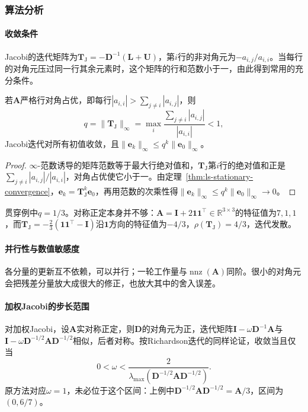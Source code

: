 \subsubsection{算法分析}

\paragraph{收敛条件}
Jacobi的迭代矩阵为$\bm T_{\mathrm J}=-\bm D^{-1}(\bm L+\bm U)$，第$i$行的非对角元为$-a_{i,j}/a_{i,i}$。当每行的对角元压过同一行其余元素时，这个矩阵的行和范数小于一，由此得到常用的充分条件。
\begin{theorem}[Jacobi迭代的收敛条件]
\label{thm:ls-jacobi-convergence}
若$\bm A$严格行对角占优，即每行$|a_{i,i}|>\sum_{j\neq i}|a_{i,j}|$，则
\[
q=\lVert\bm T_{\mathrm J}\rVert_\infty=\max_i\frac{\sum_{j\neq i}|a_{i,j}|}{|a_{i,i}|}<1,
\]
Jacobi迭代对所有初值收敛，且$\lVert\bm e_k\rVert_\infty\leq q^k\lVert\bm e_0\rVert_\infty$。
\end{theorem}
\begin{proof}
$\infty$-范数诱导的矩阵范数等于最大行绝对值和，$\bm T_{\mathrm J}$第$i$行的绝对值和正是$\sum_{j\neq i}|a_{i,j}|/|a_{i,i}|$，对角占优使它小于一。由定理~\ref{thm:ls-stationary-convergence}，$\bm e_k=\bm T_{\mathrm J}^k\bm e_0$，再用范数的次乘性得$\lVert\bm e_k\rVert_\infty\leq q^k\lVert\bm e_0\rVert_\infty\to0$。
\end{proof}
贯穿例中$q=1/3$。对称正定本身并不够：$\bm A=\bm I+2\bm 1\bm 1^\top\in\mathbb R^{3\times3}$的特征值为$7,1,1$，而$\bm T_{\mathrm J}=-\tfrac23(\bm 1\bm 1^\top-\bm I)$沿$\bm 1$方向的特征值为$-4/3$，$\rho(\bm T_{\mathrm J})=4/3$，迭代发散。

\paragraph{并行性与数值敏感度}
各分量的更新互不依赖，可以并行；一轮工作量与$\operatorname{nnz}(\bm A)$同阶。很小的对角元会把残差分量放大成很大的修正，也放大其中的舍入误差。

\paragraph{加权Jacobi的步长范围}
对加权Jacobi，设$\bm A$实对称正定，则$\bm D$的对角元为正，迭代矩阵$\bm I-\omega\bm D^{-1}\bm A$与$\bm I-\omega\bm D^{-1/2}\bm A\bm D^{-1/2}$相似，后者对称。按Richardson迭代的同样论证，收敛当且仅当
\[
0<\omega<\frac{2}{\lambda_{\max}(\bm D^{-1/2}\bm A\bm D^{-1/2})}.
\]
原方法对应$\omega=1$，未必位于这个区间：上例中$\bm D^{-1/2}\bm A\bm D^{-1/2}=\bm A/3$，区间为$(0,6/7)$。


